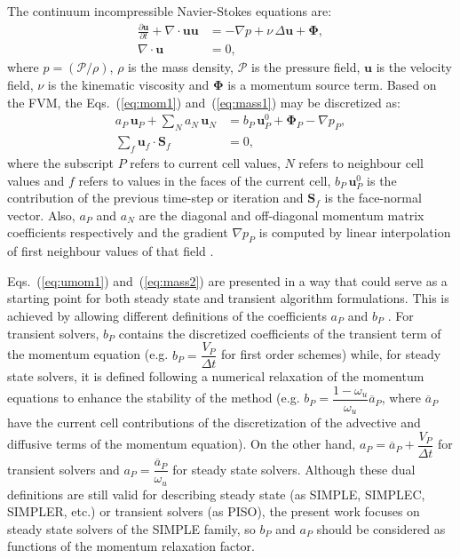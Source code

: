 \documentclass[final,3p,times,11pt,onecolumn]{myElsarticle}
\numberwithin{equation}{section}
\begin{document}
The continuum incompressible Navier-Stokes equations are:
\begin{align}
\displaystyle \frac{\partial \boldsymbol{u}}{\partial t} + \nabla \cdotp \boldsymbol{u} \boldsymbol{u} &= -\nabla p + \nu\, \Delta \boldsymbol{u} + \boldsymbol{\Phi},
\label{eq:mom1}
\\
\displaystyle \nabla \cdotp \boldsymbol{u} &= 0, 
\label{eq:mass1}
\end{align}
\noindent where $\displaystyle p = (\mathcal{P}/\rho)$, $\rho$ is the mass density, $\mathcal{P}$ is the pressure field, $\boldsymbol{u}$ is the velocity field, $\nu$ is the kinematic viscosity and $\mathbf{\Phi}$ is a momentum source term.
Based on the FVM, the Eqs.~(\ref{eq:mom1}) and~(\ref{eq:mass1}) may be discretized as:
\begin{align}
a_P\,\boldsymbol{u}_P + \sum_{N} a_{N}\,\boldsymbol{u}_{N} &= b_P\, \boldsymbol{u}^0_P + \boldsymbol{\Phi}_P - \nabla p_P,
\label{eq:umom1}
\\
\sum_{f} \boldsymbol{u}_{f} \cdotp \textbf{S}_{f} &= 0, 
\label{eq:mass2} 
\end{align}
where the subscript $P$ refers to current cell values, $N$ refers to neighbour cell values and $f$ refers to values in the faces of the current cell, $b_P\, \boldsymbol{u}^0_P$ is the contribution of the previous time-step or iteration and $\textbf{S}_{f}$ is the face-normal vector. Also, $a_P$ and $a_{N}$ are the diagonal and off-diagonal momentum matrix coefficients respectively and the gradient $\nabla p_P$ is computed by linear interpolation of first neighbour values of that field \cite{jasak, moukalled, marquez}. 

Eqs.~(\ref{eq:umom1}) and~(\ref{eq:mass2}) are presented in a way that could serve as a starting point for both steady state and transient algorithm formulations. This is achieved by allowing different definitions of the coefficients $a_P$ and $b_P$ \cite{issa2}. For transient solvers, $b_P$ contains the discretized coefficients of the transient term of the momentum equation (e.g. $b_P = \dfrac{V_P}{\Delta t}$ for first order schemes) while, for steady state solvers, it is defined following a numerical relaxation of the momentum equations to enhance the stability of the method \cite{moukalled} (e.g. $b_P = \dfrac{1-\omega_u}{\omega_u} \overline{a}_P$, where $\overline{a}_P$ have the current cell contributions of the discretization of the advective and diffusive terms of the momentum equation). On the other hand, $a_P = \overline{a}_P + \dfrac{V_P}{\Delta t}$ for transient solvers and $a_P = \dfrac{\overline{a}_P}{\omega_u}$ for steady state solvers. Although these dual definitions are still valid for describing steady state (as SIMPLE, SIMPLEC, SIMPLER, etc.) or transient solvers (as PISO), the present work focuses on steady state solvers of the SIMPLE family, so $b_P$ and $a_P$ should be considered as functions of the momentum relaxation factor.
\end{document}
